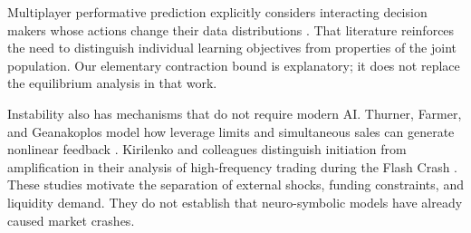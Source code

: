 
Multiplayer performative prediction explicitly considers interacting decision makers whose actions change their data distributions \cite{narang}. That literature reinforces the need to distinguish individual learning objectives from properties of the joint population. Our elementary contraction bound is explanatory; it does not replace the equilibrium analysis in that work.

Instability also has mechanisms that do not require modern AI. Thurner, Farmer, and Geanakoplos model how leverage limits and simultaneous sales can generate nonlinear feedback \cite{thurner}. Kirilenko and colleagues distinguish initiation from amplification in their analysis of high-frequency trading during the Flash Crash \cite{kirilenko}. These studies motivate the separation of external shocks, funding constraints, and liquidity demand. They do not establish that neuro-symbolic models have already caused market crashes.


